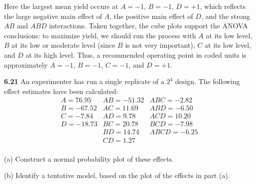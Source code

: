 \documentclass[answers,12pt,addpoints]{exam}
\begin{document}
\begin{solution}
Here the largest mean yield occurs at $A=-1$, $B=-1$, $D=+1$, which reflects the large negative main effect of $A$, the positive main effect of $D$, and the strong $AB$ and $ABD$ interactions. Taken together, the cube plots support the ANOVA conclusions: to maximize yield, we should run the process with $A$ at its low level, $B$ at its low or moderate level (since $B$ is not very important), $C$ at its low level, and $D$ at its high level. Thus, a recommended operating point in coded units is approximately $A=-1$, $B=-1$, $C=-1$, and $D=+1$.

\end{solution}

\textbf{6.21}
An experimenter has run a single replicate of a $2^4$ design. The following effect estimates have been calculated:
\[
\begin{array}{llll}
A = 76.95 & AB = -51.32 & ABC = -2.82 \\
B = -67.52 & AC = 11.69 & ABD = -6.50 \\
C = -7.84 & AD = 9.78 & ACD = 10.20 \\
D = -18.73 & BC = 20.78 & BCD = -7.98 \\
 & BD = 14.74 & ABCD = -6.25 \\
 & CD = 1.27 & \\
\end{array}
\]

\noindent
(a) Construct a normal probability plot of these effects.

\noindent
(b) Identify a tentative model, based on the plot of the effects in part (a).
\end{document}
